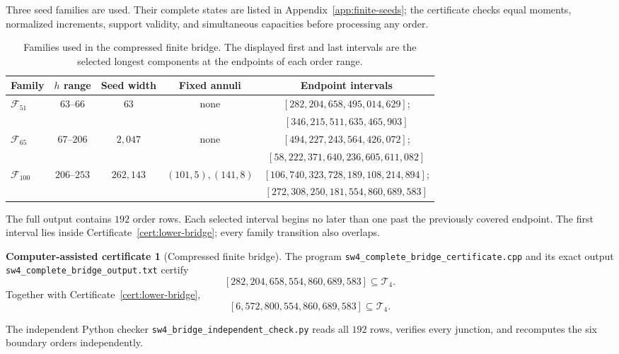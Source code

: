 \documentclass[11pt]{article}
\theoremstyle{definition}
\newtheorem{certificate}[theorem]{Computer-assisted certificate}
\theoremstyle{remark}
\newcommand{\Tfour}{\mathcal T_4}
\newcommand{\interval}[2]{\left[#1,#2\right]}
\newcommand{\code}[1]{\nolinkurl{#1}}
\begin{document}
Three seed families are used.  Their complete states are listed in
Appendix~\ref{app:finite-seeds}; the certificate checks equal moments,
normalized increments, support validity, and simultaneous capacities before
processing any order.

\begin{table}[ht]
\centering
\caption{Families used in the compressed finite bridge.  The displayed first
and last intervals are the selected longest components at the endpoints of
each order range.}
\label{tab:finite-bridge-families}
\small
\begin{tabular}{@{}lcccc@{}}
\toprule
Family & $h$ range & Seed width & Fixed annuli & Endpoint intervals \\
\midrule
$\mathcal F_{51}$ & $63$--$66$ & $63$ & none &
$[282{,}204{,}658,495{,}014{,}629]$;\\
&&&&$[346{,}215{,}511,635{,}465{,}903]$\\[2pt]
$\mathcal F_{65}$ & $67$--$206$ & $2{,}047$ & none &
$[494{,}227{,}243,564{,}426{,}072]$;\\
&&&&$[58{,}222{,}371{,}640,236{,}605{,}611{,}082]$\\[2pt]
$\mathcal F_{100}$ & $206$--$253$ & $262{,}143$ & $(101,5),(141,8)$ &
$[106{,}740{,}323{,}728,189{,}108{,}214{,}894]$;\\
&&&&$[272{,}308{,}250{,}181,554{,}860{,}689{,}583]$\\
\bottomrule
\end{tabular}
\end{table}

The full output contains $192$ order rows.  Each selected interval begins no
later than one past the previously covered endpoint.  The first interval lies
inside Certificate~\ref{cert:lower-bridge}; every family transition also
overlaps.

\begin{certificate}[Compressed finite bridge]\label{cert:compressed-bridge}
The program \code{sw4_complete_bridge_certificate.cpp} and its exact output
\code{sw4_complete_bridge_output.txt} certify
\[
  \interval{282{,}204{,}658}{554{,}860{,}689{,}583}
  \subseteq\Tfour.
\]
Together with Certificate~\ref{cert:lower-bridge},
\begin{equation}\label{eq:finite-bridge}
  \boxed{
  \interval{6{,}572{,}800}{554{,}860{,}689{,}583}
  \subseteq\Tfour.}
\end{equation}
\end{certificate}

The independent Python checker
\code{sw4_bridge_independent_check.py} reads all $192$ rows, verifies every
junction, and recomputes the six boundary orders independently.
\end{document}

